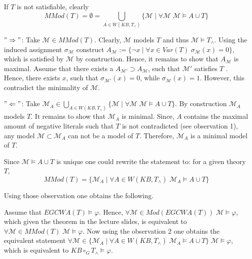 \documentclass[11pt,a4paper]{article}
\newcommand{\nmodels}{\not\models}
\begin{document}
\begin{enumerate}
\begin{itemize}

If $T$ is not satisfiable, clearly 
\begin{equation*}
\mathit{MMod}(T) = \emptyset = \bigcup_{A \in W( \mathit{KB} , T_{\land})} \{ \mathcal{M} \mid \forall \mathcal{M} \; \mathcal{M} \models A \cup T\}
\end{equation*}


$" \Rightarrow "$: Take $\mathcal{M} \in \mathit{MMod}(T)$. Clearly, $\mathcal{M}$ models $T$ and thus $\mathcal{M} \models T_{\land}$. Using the induced assignment  $\sigma_{\mathcal{M}}$ construct $A_{\mathcal{M}}:= \{ \neg x \mid \forall x \in \mathit{Var}(T)\; \sigma_{\mathcal{M}}(x)=0 \}$, which is satisfied by $\mathcal{M}$ by construction. Hence, it remains to show that $A_{\mathcal{M}}$ is maximal. Assume that there exists a  $A_{\mathcal{M}'} \supset A_{\mathcal{M}}$, such that $\mathcal{M}'$ satisfies $T$ . Hence, there exists $x$, such that $\sigma_{\mathcal{M}'}(x)=0$, while $\sigma_{\mathcal{M}}(x)=1$. However, this contradict the minimality of $\mathcal{M}$. 


$" \Leftarrow "$: Take $\mathcal{M}_A \in\bigcup_{A \in W( \mathit{KB} , T_{\land})} \{ \mathcal{M} \mid \forall \mathcal{M} \; \mathcal{M} \models A \cup T\}$.
By construction $\mathcal{M}_A$ models $T$. It remains to show that $\mathcal{M}_A$ is minimal. Since, $A$ contains the maximal amount of negative literals such that $T$ is not contradicted (see observation 1), any model $\mathcal{M} \subset  \mathcal{M}_A$ can not be a model of $T$. Therefore, $\mathcal{M}_A$ is a minimal model of $T$.


Since $\mathcal{M} \models A \cup T$ is unique one could rewrite the statement to: for a given theory $T$, 
\begin{equation*}
\mathit{MMod}(T)=\{\mathcal{M}_A \mid \forall A \in W ( \mathit{KB}, T_{\land}) \; \mathcal{M}_A \models A \cup T\}
\end{equation*}

Using those observation one obtains the following. 

Assume that $\mathit{EGCWA}(T) \models \varphi$. Hence, $\forall \mathcal{M} \in \mathit{Mod}(\mathit{EGCWA}(T)) \; \mathcal{M} \models \varphi$, which given the theorem in the lecture slides, is equivalent to $\forall \mathcal{M} \in \mathit{MMod}(T) \; \mathcal{M} \models \varphi$. Now using the observation 2 one obtains the equivalent statement $\forall \mathcal{M} \in \{\mathcal{M}_A \mid \forall A \in W ( \mathit{KB}, T_{\land}) \; \mathcal{M}_A \models A \cup T\} \; \mathcal{M} \models \varphi$, which is equivalent to $  \mathit{KB} \circ_G   T_{\land}  \models \varphi$. \\



\end{itemize}
\end{enumerate}
\end{document}
